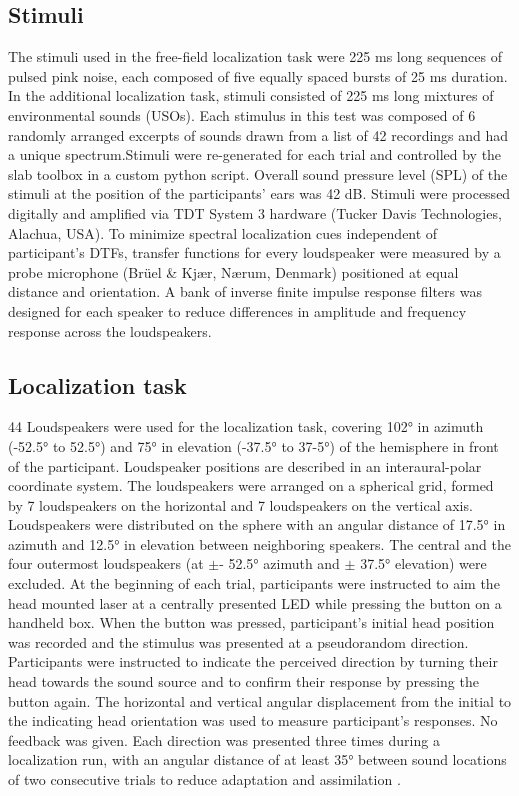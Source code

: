 \subsection{Stimuli}
The stimuli used in the free-field localization task were 225 ms long sequences of pulsed pink noise, each composed of five equally spaced bursts of 25 ms duration. In the additional localization task, stimuli consisted of 225 ms long mixtures of environmental sounds (USOs). Each stimulus in this test was composed of 6 randomly arranged excerpts of sounds drawn from a list of 42 recordings and had a unique spectrum.Stimuli were re-generated for each trial and controlled by the slab toolbox \citep{schonwiesner_soundlab_2021} in a custom python script. Overall sound pressure level (SPL) of the stimuli at the position of the participants’ ears was 42 dB. Stimuli were processed digitally and amplified via TDT System 3 hardware (Tucker Davis Technologies, Alachua, USA). To minimize spectral localization cues independent of participant’s DTFs, transfer functions for every loudspeaker were measured by a probe microphone (Brüel \& Kjær, Nærum, Denmark) positioned at equal distance and orientation. A bank of inverse finite impulse response filters was designed for each speaker to reduce differences in amplitude and frequency response across the loudspeakers. 

\subsection{Localization task} 
44 Loudspeakers were used for the localization task, covering 102° in azimuth (-52.5° to 52.5°) and 75° in elevation (-37.5° to 37-5°) of the hemisphere in front of the participant. Loudspeaker positions are described in an interaural-polar coordinate system. The loudspeakers were arranged on a spherical grid, formed by 7 loudspeakers on the horizontal and 7 loudspeakers on the vertical axis. Loudspeakers were distributed on the sphere with an angular distance of 17.5° in azimuth and 12.5° in elevation between neighboring speakers. The central and the four outermost loudspeakers (at $\pm$- 52.5° azimuth and  $\pm$ 37.5° elevation) were excluded. At the beginning of each trial, participants were instructed to aim the head mounted laser at a centrally presented LED while pressing the button on a handheld box. When the button was pressed, participant’s initial head position was recorded and the stimulus was presented at a pseudorandom direction. Participants were instructed to indicate the perceived direction by turning their head towards the sound source and to confirm their response by pressing the button again. The horizontal and vertical angular displacement from the initial to the indicating head orientation was used to measure participant’s responses. No feedback was given. Each direction was presented three times during a localization run, with an angular distance of at least 35° between sound locations of two consecutive trials to reduce adaptation and assimilation \citep{ward_stimulus_1979}. 

